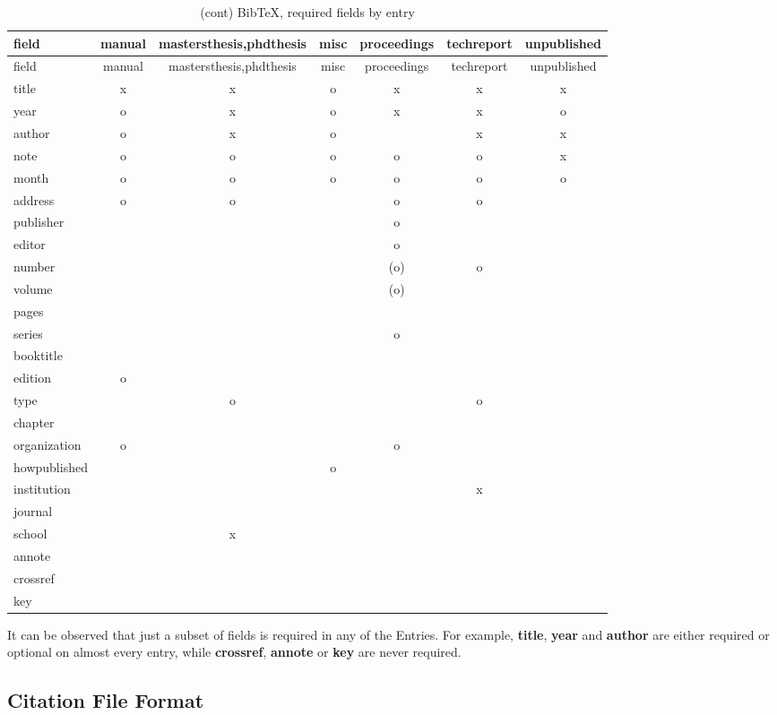 \documentclass[
]{article}
\begin{document}
\begin{longtable}[]{@{}lcccccc@{}}
\caption{(cont) BibTeX, required fields by entry}\tabularnewline
\toprule
field & manual & mastersthesis,phdthesis & misc & proceedings &
techreport & unpublished \\
\midrule
\endfirsthead
\toprule
field & manual & mastersthesis,phdthesis & misc & proceedings &
techreport & unpublished \\
\midrule
\endhead
title & x & x & o & x & x & x \\
year & o & x & o & x & x & o \\
author & o & x & o & & x & x \\
note & o & o & o & o & o & x \\
month & o & o & o & o & o & o \\
address & o & o & & o & o & \\
publisher & & & & o & & \\
editor & & & & o & & \\
number & & & & (o) & o & \\
volume & & & & (o) & & \\
pages & & & & & & \\
series & & & & o & & \\
booktitle & & & & & & \\
edition & o & & & & & \\
type & & o & & & o & \\
chapter & & & & & & \\
organization & o & & & o & & \\
howpublished & & & o & & & \\
institution & & & & & x & \\
journal & & & & & & \\
school & & x & & & & \\
annote & & & & & & \\
crossref & & & & & & \\
key & & & & & & \\
\bottomrule
\end{longtable}

It can be observed that just a subset of fields is required in any of
the Entries. For example, \textbf{title}, \textbf{year} and
\textbf{author} are either required or optional on almost every entry,
while \textbf{crossref}, \textbf{annote} or \textbf{key} are never
required.

\hypertarget{citation-file-format}{%
\subsection{Citation File Format}\label{citation-file-format}}
\end{document}
